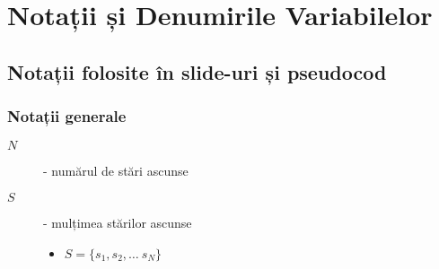 \documentclass[12pt]{article}
\begin{document}
\section{Notații și Denumirile Variabilelor}
\label{sec:notations}

\subsection{Notații folosite în slide-uri și pseudocod}
\label{sec:notation}

\subsubsection{Notații generale}
\label{sec:general}

\begin{description}
\item[$N$] - numărul de stări ascunse
\item[$S$] - mulțimea stărilor ascunse
  \begin{itemize}
  \item $S=\lbrace s_1, s_2, \ldots\ s_N \rbrace$
  \end{itemize}


\end{description}
\end{document}
